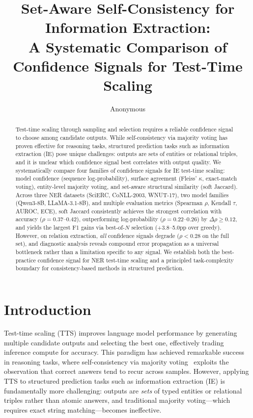 \documentclass[11pt,a4paper]{article}
\title{Set-Aware Self-Consistency for Information Extraction: \\
A Systematic Comparison of Confidence Signals for Test-Time Scaling}
\author{Anonymous}
\begin{document}
\maketitle

\begin{abstract}
Test-time scaling through sampling and selection requires a reliable confidence signal to choose among candidate outputs. While self-consistency via majority voting has proven effective for reasoning tasks, structured prediction tasks such as information extraction (IE) pose unique challenges: outputs are sets of entities or relational triples, and it is unclear which confidence signal best correlates with output quality. We systematically compare four families of confidence signals for IE test-time scaling: model confidence (sequence log-probability), surface agreement (Fleiss' $\kappa$, exact-match voting), entity-level majority voting, and set-aware structural similarity (soft Jaccard). Across three NER datasets (SciERC, CoNLL-2003, WNUT-17), two model families (Qwen3-8B, LLaMA-3.1-8B), and multiple evaluation metrics (Spearman $\rho$, Kendall $\tau$, AUROC, ECE), soft Jaccard consistently achieves the strongest correlation with accuracy ($\rho=0.37$--$0.42$), outperforming log-probability ($\rho=0.22$--$0.26$) by $\Delta\rho \geq 0.12$, and yields the largest F1 gains via best-of-$N$ selection (+3.8--5.0pp over greedy). However, on relation extraction, \emph{all} confidence signals degrade ($\rho < 0.28$ on the full set), and diagnostic analysis reveals compound error propagation as a universal bottleneck rather than a limitation specific to any signal. We establish both the best-practice confidence signal for NER test-time scaling and a principled task-complexity boundary for consistency-based methods in structured prediction.
\end{abstract}

\section{Introduction}
\label{sec:intro}

Test-time scaling (TTS) improves language model performance by generating multiple candidate outputs and selecting the best one, effectively trading inference compute for accuracy. This paradigm has achieved remarkable success in reasoning tasks, where self-consistency via majority voting~\cite{wang2023selfconsistency} exploits the observation that correct answers tend to recur across samples. However, applying TTS to structured prediction tasks such as information extraction (IE) is fundamentally more challenging: outputs are \emph{sets} of typed entities or relational triples rather than atomic answers, and traditional majority voting---which requires exact string matching---becomes ineffective.
\end{document}
